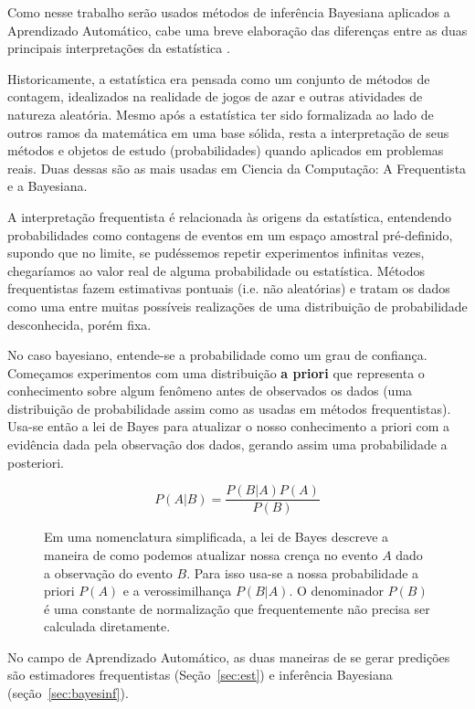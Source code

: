 Como nesse trabalho serão usados métodos de inferência Bayesiana aplicados a Aprendizado Automático,
cabe uma breve elaboração das diferenças entre as duas principais
interpretações da estatística \citep{dlbook}. 

Historicamente, a estatística era pensada como um conjunto de métodos de
contagem, idealizados na realidade de jogos de azar e outras atividades de
natureza aleatória. Mesmo após a estatística ter sido formalizada ao lado de
outros ramos da matemática em uma base sólida, resta a interpretação de seus
métodos e objetos de estudo (probabilidades) quando aplicados em problemas
reais. Duas dessas são as mais usadas em Ciencia da Computação: A Frequentista e a
Bayesiana.

A interpretação frequentista é relacionada às origens da estatística, entendendo
probabilidades como contagens de eventos em um espaço amostral pré-definido,
supondo que no limite, se pudéssemos repetir experimentos infinitas vezes,
chegaríamos ao valor real de alguma probabilidade ou estatística. Métodos
frequentistas fazem estimativas pontuais (i.e. não aleatórias) e tratam os dados como uma entre muitas
possíveis realizações de uma distribuição de probabilidade desconhecida, porém fixa. 

No caso bayesiano, entende-se a probabilidade como um grau de confiança. Começamos
experimentos com uma distribuição \textbf{a priori} que representa o
conhecimento sobre algum fenômeno antes de observados os dados (uma distribuição
de probabilidade assim como as usadas em métodos frequentistas). Usa-se então a
lei de Bayes para atualizar o nosso conhecimento a priori com a evidência dada
pela observação dos dados, gerando assim uma probabilidade a posteriori.

 \begin{figure} 
\[
  P(A|B)=\frac{P(B|A)P(A)}{P(B)}
\]
\caption{Em uma nomenclatura simplificada, a lei de Bayes descreve a maneira de
  como podemos atualizar nossa crença no evento $A$ dado a observação do evento
  $B$. Para isso usa-se a nossa probabilidade a priori $P(A)$ e a verossimilhança
  $P(B|A)$. O denominador $P(B)$ é uma constante de normalização que
  frequentemente não precisa ser calculada diretamente.}
  \end{figure}




No campo de Aprendizado Automático, as duas maneiras de se gerar predições são estimadores
frequentistas (Seção~\ref{sec:est}) e inferência Bayesiana (seção~\ref{sec:bayesinf}).


